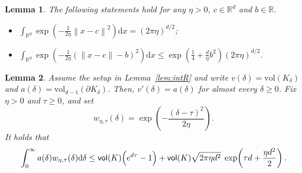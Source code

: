 \documentclass[10pt,a4paper]{amsart}
\newtheorem{lemma}{Lemma}
\newcommand{\D}{\mathrm{d}}
\newcommand{\R}{\mathbb{R}}
\newcommand{\brac}[1]{\left( #1\right)}
\newcommand{\norm}[1]{\left\lVert #1 \right\rVert}
\newcommand{\vol}{\mathsf{vol}}
\begin{document}
\begin{lemma}\label{lem:gaussianint}
The following statements hold for any $\eta>0$, $c\in \R^d$ and $b\in \R$.
\begin{itemize}
    \item[(a)] $ \int_{\R^d} \exp\brac{-\frac{1}{2\eta} \norm{x-c}^2} \D x=(2\pi \eta)^{d/2}$;

    \item[(b)] $ \int_{\R^d} \exp\left(-\frac{1}{2\eta}(\|x-c\|-b)^2\right) \D x
    \le \exp \left(\frac14 + \frac{d}{\eta}b^2\right)(2\pi\eta)^{d/2}.$

\end{itemize} 
\end{lemma}

\begin{lemma}
\label{lem:alternativeintbypart}
Assume the setup in Lemma~\ref{lem:intR} and write $v(\delta)= \mathrm{vol}(K_\delta)$ and $a(\delta) = \mathrm{vol}_{d-1}(\partial K_\delta)$. Then, $v'(\delta)=a(\delta)$ for almost every
$\delta\ge 0$.
Fix $\eta>0$ and $\tau\ge 0$, and set
\[
  w_{\eta,\tau}(\delta)
  = \exp\!\left(-\frac{(\delta-\tau)^2}{2\eta}\right).
\]
It holds that
\[
\int_0^\infty a(\delta) w_{\eta,\tau}(\delta) \D\delta
\le
\vol(K)\Bigl(e^{d\tau}-1\Bigr)
+
\vol(K)\sqrt{2\pi\eta d^2}\;
\exp\!\left(\tau d+\frac{\eta d^2}{2}\right).
\]
\end{lemma}
\end{document}
